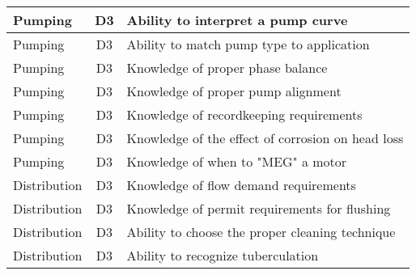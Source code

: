 \documentclass{article}
\begin{document}
\begin{table}[]
\begin{tabular}{|l|c|l|}
Pumping                                & D3             & Ability to interpret   a pump curve                                                                                               \\ \hline
Pumping                                & D3             & Ability to match pump   type to application                                                                                       \\ \hline
Pumping                                & D3             & Knowledge of proper   phase balance                                                                                               \\ \hline
Pumping                                & D3             & Knowledge of proper   pump alignment                                                                                              \\ \hline
Pumping                                & D3             & Knowledge of   recordkeeping requirements                                                                                         \\ \hline
Pumping                                & D3             & Knowledge of the   effect of corrosion on head loss                                                                               \\ \hline
Pumping                                & D3             & Knowledge of when to   "MEG" a motor                                                                                              \\ \hline
Distribution                           & D3             & Knowledge of flow   demand requirements                                                                                           \\ \hline
Distribution                           & D3             & Knowledge of permit   requirements for flushing                                                                                   \\ \hline
Distribution                           & D3             & Ability to choose the   proper cleaning technique                                                                                 \\ \hline
Distribution                           & D3             & Ability to recognize   tuberculation                                                                                              \\ \hline

\end{tabular}
\end{table}
\end{document}

